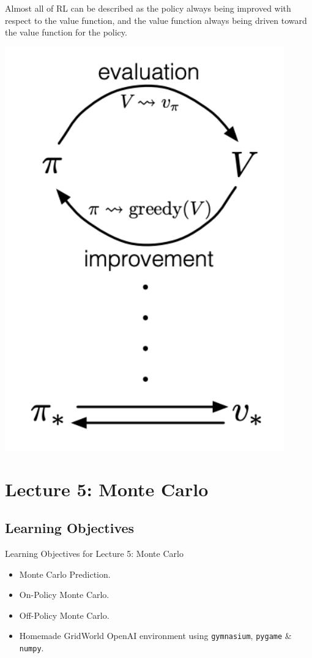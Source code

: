 \documentclass[
  letterpaper,
  DIV=11,
  numbers=noendperiod]{scrreprt}
\providecommand{\tightlist}{%
  \setlength{\itemsep}{0pt}\setlength{\parskip}{0pt}}\usepackage{longtable,booktabs,array}
\begin{document}
Almost all of RL can be described as the policy always being improved
with respect to the value function, and the value function always being
driven toward the value function for the policy.

\begin{center}
\includegraphics[width=0.4\linewidth,height=\textheight,keepaspectratio]{lecture4/images/GPI.png}
\end{center}

\part{Lecture 5: Monte Carlo}

\chapter{Learning Objectives}\label{learning-objectives-3}

\begin{tcolorbox}[enhanced jigsaw, arc=.35mm, toprule=.15mm, leftrule=.75mm, colback=white, left=2mm, colframe=quarto-callout-note-color-frame, rightrule=.15mm, opacityback=0, breakable, bottomrule=.15mm]

Learning Objectives for Lecture 5: Monte Carlo 🎯

\end{tcolorbox}

\begin{itemize}
\tightlist
\item
  Monte Carlo Prediction.
\item
  On-Policy Monte Carlo.
\item
  Off-Policy Monte Carlo.
\item
  Homemade GridWorld OpenAI environment using \texttt{gymnasium},
  \texttt{pygame} \& \texttt{numpy}.
\end{itemize}
\end{document}
